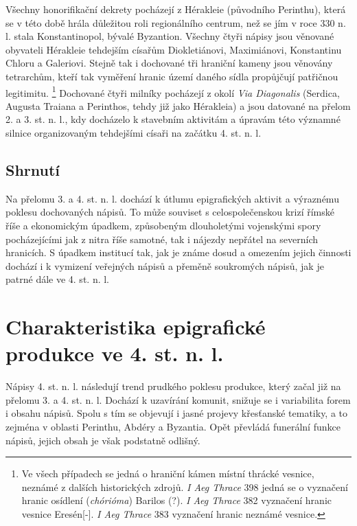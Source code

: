 Všechny honorifikační dekrety pocházejí z Hérakleie (původního Perinthu), která se v této době hrála důležitou roli regionálního centrum, než se jím v roce 330 n. l. stala Konstantinopol, bývalé Byzantion. Všechny čtyři nápisy jsou věnované obyvateli Hérakleie tehdejším císařům Diokletiánovi, Maximiánovi, Konstantinu Chloru a Galeriovi. Stejně tak i dochované tři hraniční kameny jsou věnovány tetrarchům, kteří tak vyměření hranic území daného sídla propůjčují patřičnou legitimitu. \footnote{Ve všech případech se jedná o hraniční kámen místní thrácké vesnice, neznámé z dalších historických zdrojů. {\em I Aeg Thrace} 398 jedná se o vyznačení hranic osídlení ({\em chórióma}) Barilos (?). {\em I Aeg Thrace} 382 vyznačení hranic vesnice Eresén{[}-{]}. {\em I Aeg Thrace} 383 vyznačení hranic neznámé vesnice.} Dochované čtyři milníky pocházejí z okolí {\em Via Diagonalis} (Serdica, Augusta Traiana a Perinthos, tehdy již jako Hérakleia) a jsou datované na přelom 2. a 3. st. n. l., kdy docházelo k stavebním aktivitám a úpravám této významné silnice organizovaným tehdejšími císaři na začátku 4. st. n. l.

\subsection[shrnutí-20]{Shrnutí}

Na přelomu 3. a 4. st. n. l. dochází k útlumu epigrafických aktivit a výraznému poklesu dochovaných nápisů. To může souviset s celospolečenskou krizí římské říše a ekonomickým úpadkem, způsobeným dlouholetými vojenskými spory pocházejícími jak z nitra říše samotné, tak i nájezdy nepřátel na severních hranicích. S úpadkem institucí tak, jak je známe dosud a omezením jejich činnosti dochází i k vymizení veřejných nápisů a přeměně soukromých nápisů, jak je patrné dále ve 4. st. n. l.

\section[charakteristika-epigrafické-produkce-ve-4.-st.-n.-l.]{Charakteristika epigrafické produkce ve 4. st. n. l.}

Nápisy 4. st. n. l. následují trend prudkého poklesu produkce, který začal již na přelomu 3. a 4. st. n. l. Dochází k uzavírání komunit, snižuje se i variabilita forem i obsahu nápisů. Spolu s tím se objevují i jasné projevy křesťanské tematiky, a to zejména v oblasti Perinthu, Abdéry a Byzantia. Opět převládá funerální funkce nápisů, jejich obsah je však podstatně odlišný.

